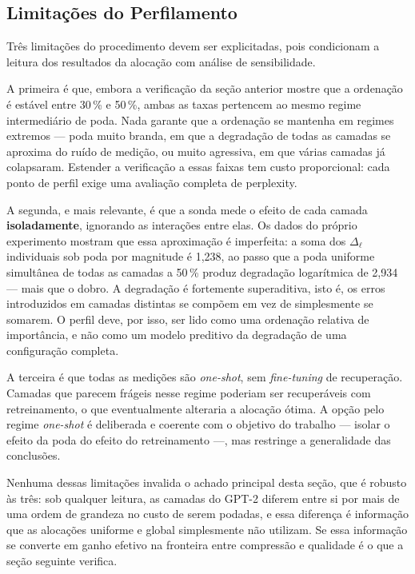 \subsection{Limitações do Perfilamento}\label{subsec:limitacoes_perfil}

Três limitações do procedimento devem ser explicitadas, pois condicionam a
leitura dos resultados da alocação com análise de sensibilidade.

A primeira é que, embora a verificação da seção anterior mostre que a
ordenação é estável entre 30\,\% e 50\,\%, ambas as taxas pertencem ao mesmo
regime intermediário de poda. Nada garante que a ordenação se mantenha em
regimes extremos --- poda muito branda, em que a degradação de todas as
camadas se aproxima do ruído de medição, ou muito agressiva, em que várias
camadas já colapsaram. Estender a verificação a essas faixas tem custo
proporcional: cada ponto de perfil exige uma avaliação completa de perplexity.

A segunda, e mais relevante, é que a sonda mede o efeito de cada camada
\textbf{isoladamente}, ignorando as interações entre elas. Os dados do próprio
experimento mostram que essa aproximação é imperfeita: a soma dos
$\Delta_{\ell}$ individuais sob poda por magnitude é 1,238, ao passo que a
poda uniforme simultânea de todas as camadas a 50\,\% produz degradação
logarítmica de 2,934 --- mais que o dobro. A degradação é fortemente
superaditiva, isto é, os erros introduzidos em camadas distintas se compõem em
vez de simplesmente se somarem. O perfil deve, por isso, ser lido como uma
ordenação relativa de importância, e não como um modelo preditivo da
degradação de uma configuração completa.

A terceira é que todas as medições são \textit{one-shot}, sem
\textit{fine-tuning} de recuperação. Camadas que parecem frágeis nesse regime
poderiam ser recuperáveis com retreinamento, o que eventualmente alteraria a
alocação ótima. A opção pelo regime \textit{one-shot} é deliberada e coerente
com o objetivo do trabalho --- isolar o efeito da poda do efeito do
retreinamento ---, mas restringe a generalidade das conclusões.

Nenhuma dessas limitações invalida o achado principal desta seção, que é
robusto às três: sob qualquer leitura, as camadas do GPT-2 diferem entre si
por mais de uma ordem de grandeza no custo de serem podadas, e essa diferença
é informação que as alocações uniforme e global simplesmente não utilizam. Se
essa informação se converte em ganho efetivo na fronteira entre compressão e
qualidade é o que a seção seguinte verifica.

